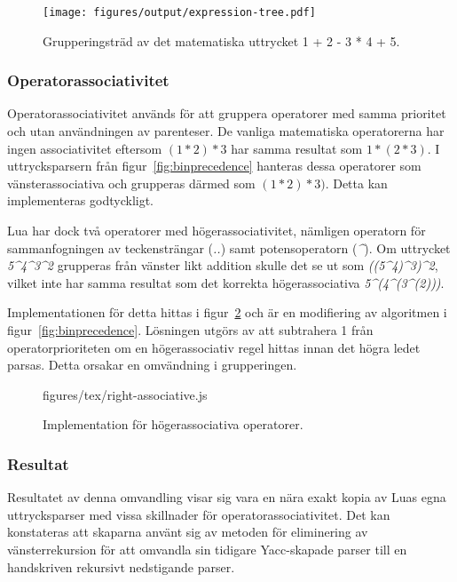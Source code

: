 \begin{figure}[ht]
  \texttt{[image: figures/output/expression-tree.pdf]}
  \caption{Grupperingsträd av det matematiska uttrycket 1 + 2 - 3 * 4 + 5.}
  \label{fig:expressiontree}
\end{figure}

\subsubsection{Operatorassociativitet}

Operatorassociativitet används för att gruppera operatorer med samma prioritet
och utan användningen av parenteser. De vanliga matematiska operatorerna har ingen
associativitet eftersom $(1 * 2) * 3$ har samma resultat som $1 * (2 * 3)$. I
uttrycksparsern från figur~\ref{fig:binprecedence} hanteras dessa operatorer
som vänsterassociativa och grupperas därmed som $(1 * 2) * 3)$. Detta kan
implementeras godtyckligt.

Lua har dock två operatorer med högerassociativitet, nämligen operatorn för
sammanfogningen av teckensträngar (\textit{..}) samt potensoperatorn
(\textit{\^{}}). Om uttrycket \textit{5\^{}4\^{}3\^{}2} grupperas från vänster likt
addition skulle det se ut som \textit{((5\^{}4)\^{}3)\^{}2}, vilket inte har
samma resultat som det korrekta högerassociativa \textit{5\^{}(4\^{}(3\^{}(2)))}.

Implementationen för detta hittas i figur~\ref{fig:rightassociative} och är en
modifiering av algoritmen i figur~\ref{fig:binprecedence}. Lösningen utgörs av
att subtrahera 1 från operatorprioriteten om en högerassociativ regel hittas
innan det högra ledet parsas. Detta orsakar en omvändning i grupperingen.

\begin{figure}[ht]
    {figures/tex/right-associative.js}
  \caption{Implementation för högerassociativa operatorer.}
  \label{fig:rightassociative}
\end{figure}

\subsubsection{Resultat}

Resultatet av denna omvandling visar sig vara en nära exakt kopia av Luas egna
uttrycksparser med vissa skillnader för operatorassociativitet. Det kan
konstateras att skaparna använt sig av metoden för eliminering av
vänsterrekursion för att omvandla sin tidigare Yacc-skapade parser till en
handskriven rekursivt nedstigande parser.

